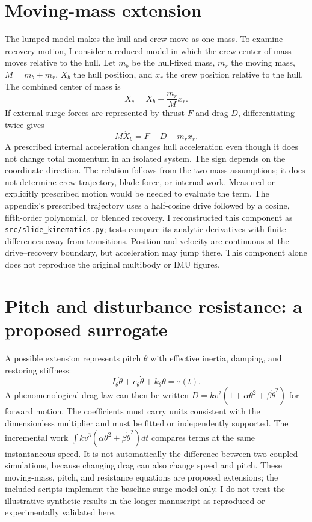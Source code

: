 \documentclass[11pt]{article}
\begin{document}
\section{Moving-mass extension}
The lumped model makes the hull and crew move as one mass. To examine recovery motion, I consider a reduced model in which the crew center of mass moves relative to the hull. Let $m_b$ be the hull-fixed mass, $m_r$ the moving mass, $M=m_b+m_r$, $X_b$ the hull position, and $x_r$ the crew position relative to the hull. The combined center of mass is
\begin{equation}X_c=X_b+\frac{m_r}{M}x_r.\end{equation}
If external surge forces are represented by thrust $F$ and drag $D$, differentiating twice gives
\begin{equation}M\ddot X_b=F-D-m_r\ddot x_r.\end{equation}
A prescribed internal acceleration changes hull acceleration even though it does not change total momentum in an isolated system. The sign depends on the coordinate direction. The relation follows from the two-mass assumptions; it does not determine crew trajectory, blade force, or internal work. Measured or explicitly prescribed motion would be needed to evaluate the term. The appendix's prescribed trajectory uses a half-cosine drive followed by a cosine, fifth-order polynomial, or blended recovery. I reconstructed this component as \texttt{src/slide\_kinematics.py}; tests compare its analytic derivatives with finite differences away from transitions. Position and velocity are continuous at the drive--recovery boundary, but acceleration may jump there. This component alone does not reproduce the original multibody or IMU figures.

\section{Pitch and disturbance resistance: a proposed surrogate}
A possible extension represents pitch $\theta$ with effective inertia, damping, and restoring stiffness:
\begin{equation}I_\theta\ddot\theta+c_\theta\dot\theta+k_\theta\theta=\tau(t).\end{equation}
A phenomenological drag law can then be written $D=kv^2(1+\alpha\theta^2+\beta\dot\theta^2)$ for forward motion. The coefficients must carry units consistent with the dimensionless multiplier and must be fitted or independently supported. The incremental work $\int kv^3(\alpha\theta^2+\beta\dot\theta^2)dt$ compares terms at the same instantaneous speed. It is not automatically the difference between two coupled simulations, because changing drag can also change speed and pitch. These moving-mass, pitch, and resistance equations are proposed extensions; the included scripts implement the baseline surge model only. I do not treat the illustrative synthetic results in the longer manuscript as reproduced or experimentally validated here.
\end{document}
